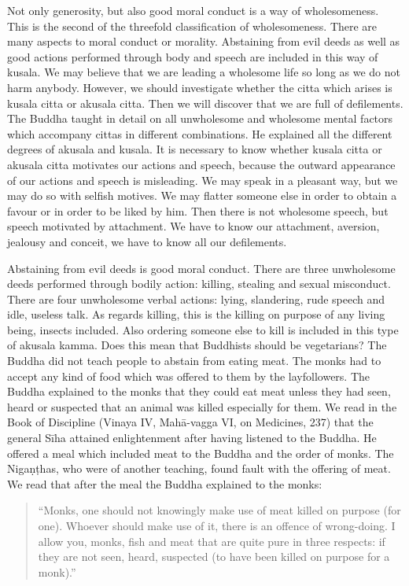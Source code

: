\documentclass{book}
\begin{document}
Not only generosity, but also good moral conduct is a way of
wholesomeness. This is the second of the threefold classification of
wholesomeness. There are many aspects to moral conduct or morality.
Abstaining from evil deeds as well as good actions performed through
body and speech are included in this way of kusala. We may believe that
we are leading a wholesome life so long as we do not harm anybody.
However, we should investigate whether the citta which arises is kusala
citta or akusala citta. Then we will discover that we are full of
defilements. The Buddha taught in detail on all unwholesome and
whole­some mental factors which accompany cittas in different
combinations. He explained all the different degrees of akusala and
kusala. It is necessary to know whether kusala citta or akusala citta
motivates our actions and speech, because the outward appearance of our
actions and speech is misleading. We may speak in a pleasant way, but we
may do so with selfish motives. We may flatter someone else in order to
obtain a favour or in order to be liked by him. Then there is not
wholesome speech, but speech motivated by attachment. We have to know
our attachment, aversion, jealousy and conceit, we have to know all our
defilements.

Abstaining from evil deeds is good moral conduct. There are three
unwholesome deeds performed through bodily action: killing, stealing and
sexual misconduct. There are four unwholesome verbal actions: lying,
slandering, rude speech and idle, useless talk. As regards killing, this
is the killing on purpose of any living being, insects included. Also
ordering someone else to kill is included in this type of akusala kamma.
Does this mean that Buddhists should be vegetarians? The Buddha did not
teach people to abstain from eating meat. The monks had to accept any
kind of food which was offered to them by the layfollowers. The Buddha
explained to the monks that they could eat meat unless they had seen,
heard or suspected that an animal was killed especially for them. We
read in the Book of Discipline (Vinaya IV, Mahā-vagga VI, on Medicines,
237) that the general Sīha attained enlightenment after having listened
to the Buddha. He offered a meal which included meat to the Buddha and
the order of monks. The Nigaṇṭhas, who were of another teaching, found
fault with the offering of meat. We read that after the meal the Buddha
explained to the monks:

\begin{quote}
``Monks, one should not knowingly make use of meat killed on purpose
(for one). Whoever should make use of it, there is an offence of
wrong-doing. I allow you, monks, fish and meat that are quite pure in
three respects: if they are not seen, heard, suspected (to have been
killed on purpose for a monk).''
\end{quote}
\end{document}
